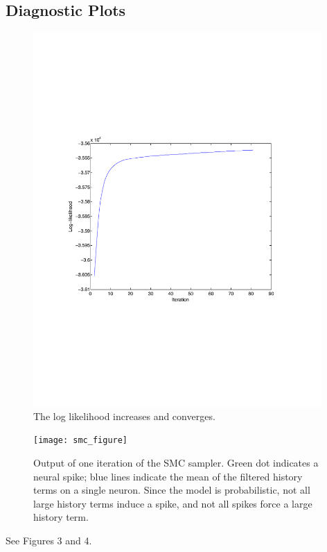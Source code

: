 \documentclass{article}
\begin{document}
\subsection{Diagnostic Plots}
\begin{figure}
\label{fig:loglikelihood}
\centering
\includegraphics[width=0.98\textwidth, trim = 0mm 15mm 15mm 0mm, clip]{25n_noise_ll}
\caption{The log likelihood increases and converges.}
\end{figure}

\begin{figure}
\label{fig:smc}
\centering
\texttt{[image: smc\_figure]}
\caption{Output of one iteration of the SMC sampler. Green dot indicates a neural spike; blue lines indicate the mean of the filtered history terms on a single neuron. Since the model is probabilistic, not all large history terms induce a spike, and not all spikes force a large history term.}
\end{figure}
See Figures 3 and 4.
\end{document}
